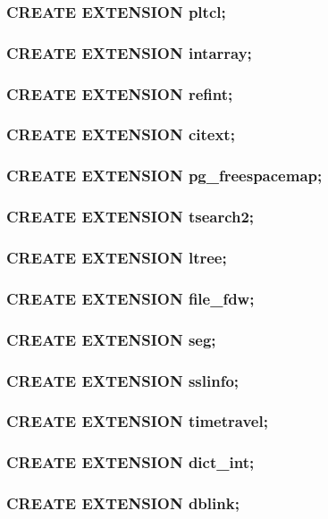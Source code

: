 \documentclass[utf8,hyperref={pdftex,colorlinks,linkcolor=black,citecolor=black,urlcolor=black,filecolor=black,plainpages=false},xcolor=table,hyperref]{beamer}
\begin{document}
\begin{frame}[containsverbatim]
	\frametitle{CREATE EXTENSION pltcl;}
\end{frame}

\begin{frame}[containsverbatim]
	\frametitle{CREATE EXTENSION intarray;}
\end{frame}

\begin{frame}[containsverbatim]
	\frametitle{CREATE EXTENSION refint;}
\end{frame}

\begin{frame}[containsverbatim]
	\frametitle{CREATE EXTENSION citext;}
\end{frame}

\begin{frame}[containsverbatim]
	\frametitle{CREATE EXTENSION pg_freespacemap;}
\end{frame}

\begin{frame}[containsverbatim]
	\frametitle{CREATE EXTENSION tsearch2;}
\end{frame}

\begin{frame}[containsverbatim]
	\frametitle{CREATE EXTENSION ltree;}
\end{frame}

\begin{frame}[containsverbatim]
	\frametitle{CREATE EXTENSION file_fdw;}
\end{frame}

\begin{frame}[containsverbatim]
	\frametitle{CREATE EXTENSION seg;}
\end{frame}

\begin{frame}[containsverbatim]
	\frametitle{CREATE EXTENSION sslinfo;}
\end{frame}

\begin{frame}[containsverbatim]
	\frametitle{CREATE EXTENSION timetravel;}
\end{frame}

\begin{frame}[containsverbatim]
	\frametitle{CREATE EXTENSION dict_int;}
\end{frame}

\begin{frame}[containsverbatim]
	\frametitle{CREATE EXTENSION dblink;}
\end{frame}
\end{document}
